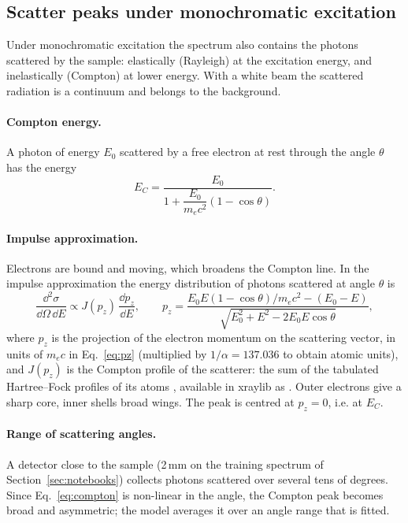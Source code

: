 \subsection{Scatter peaks under monochromatic excitation}\label{sec:scatter}

Under monochromatic excitation the spectrum also contains the photons scattered by the
sample: elastically (Rayleigh) at the excitation energy, and inelastically (Compton) at
lower energy. With a white beam the scattered radiation is a continuum and belongs to the
background.

\paragraph{Compton energy.} A photon of energy $E_0$ scattered by a free electron at rest
through the angle $\theta$ has the energy \citep{Compton1923}
\begin{equation}
  E_C = \frac{E_0}{1 + \dfrac{E_0}{m_ec^2}(1-\cos\theta)} .
  \label{eq:compton}
\end{equation}

\paragraph{Impulse approximation.} Electrons are bound and moving, which broadens the Compton
line. In the impulse approximation \citep{Eisenberger1970,Ribberfors1975} the energy
distribution of photons scattered at angle $\theta$ is
\begin{equation}
  \frac{\dd^2\sigma}{\dd\Omega\,\dd E} \propto J(p_z)\,\frac{\dd p_z}{\dd E},
  \qquad
  p_z = \frac{E_0E(1-\cos\theta)/m_ec^2 - (E_0-E)}{\sqrt{E_0^2+E^2-2E_0E\cos\theta}},
  \label{eq:pz}
\end{equation}
where $p_z$ is the projection of the electron momentum on the scattering vector, in units of
$m_ec$ in Eq.~\eqref{eq:pz} (multiplied by $1/\alpha = 137.036$ to obtain atomic units), and
$J(p_z)$ is the Compton profile of the scatterer: the sum of the tabulated Hartree--Fock
profiles of its atoms \citep{Biggs1975}, available in xraylib as . Outer
electrons give a sharp core, inner shells broad wings. The peak is centred at $p_z=0$, i.e.
at $E_C$.

\paragraph{Range of scattering angles.} A detector close to the sample (2\,mm on the
training spectrum of Section~\ref{sec:notebooks}) collects photons scattered over several
tens of degrees. Since Eq.~\eqref{eq:compton} is non-linear in the angle, the Compton peak
becomes broad and asymmetric; the model averages it over an angle range that is fitted.

